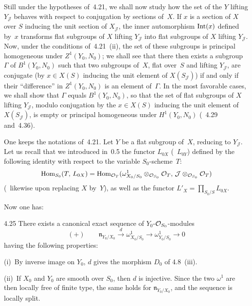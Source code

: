 \label{III.4.23}
Still under the hypotheses of~4.21, we shall now study how the set of the
\(Y\) lifting \(Y_{\mathcal{J}}\) behaves with respect to conjugation by
sections of~\(X\). If \(x\) is a section of \(X\) over \(S\) inducing the unit
section of \(X_{\mathcal{J}}\), the inner automorphism \(\operatorname{Int}(x)\) defined
by~\(x\) transforms flat subgroups of \(X\) lifting \(Y_{\mathcal{J}}\) into
flat subgroups of \(X\) lifting \(Y_{\mathcal{J}}\). Now, under the conditions
of~4.21~(ii), the set of these subgroups is principal homogeneous under
\(Z^{1}(Y_{0},N_{0})\); we shall see that there then exists a subgroup
\(\Gamma\) of \(B^{1}(Y_{0},N_{0})\)%
{\renewcommand{\thefootnote}{(121)}}
such that two subgroups of~\(X\), flat over~\(S\) and lifting
\(Y_{\mathcal{J}}\), are conjugate (by \(x\in X(S)\) inducing the unit element
of \(X(S_{\mathcal{J}})\)) if and only if their ``difference'' in
\(Z^{1}(Y_{0},N_{0})\) is an element of~\(\Gamma\). In the most favorable
cases, we shall show that \(\Gamma\) equals \(B^{1}(Y_{0},N_{0})\), so that
the set of flat subgroups of \(X\) lifting \(Y_{\mathcal{J}}\), modulo
conjugation by the \(x\in X(S)\) inducing the unit element of
\(X(S_{\mathcal{J}})\), is empty or principal homogeneous under
\(H^{1}(Y_{0},N_{0})\) (\cf~4.29 and~4.36).

\label{III.4.24}
One keeps the notations of~4.21. Let \(Y\) be a flat subgroup of~\(X\),
reducing to \(Y_{\mathcal{J}}\). Let us recall that we introduced in~0.5 the
functor \(L_{0X}\) (\resp\ \(L_{0Y}\)) defined by the following identity with
respect to the variable \(S_{0}\)-scheme~\(T\):
\[
\operatorname{Hom}_{S_{0}}(T,\,L_{0X})
=
\operatorname{Hom}_{\mathcal{O}_{T}}(\omega^{1}_{X_{0}/S_{0}}\otimes_{\mathcal{O}_{S_{0}}}\mathcal{O}_{T},\,
\mathcal{J}\otimes_{\mathcal{O}_{S_{0}}}\mathcal{O}_{T})
\]
(\resp\ likewise upon replacing \(X\) by~\(Y\)), as well as the functor
\(L'_{X}=\prod_{S_{0}/S}L_{0X}\).

Now one has:

\begin{lemma}{4.25}\label{III.4.25}
There exists a canonical exact sequence of \(Y_{0}\)-\(\mathcal{O}_{S_{0}}\)-modules
\[
(+)\qquad
\mathfrak{n}_{Y_{0}/X_{0}}
\xrightarrow{d}
\omega^{1}_{X_{0}/S_{0}}
\longrightarrow
\omega^{1}_{Y_{0}/S_{0}}
\longrightarrow
0
\]
having the following properties:

(i)~By inverse image on \(Y_{0}\), \(d\) gives the morphism \(D_{0}\) of
4.8~(iii).

(ii)~If \(X_{0}\) and \(Y_{0}\) are smooth over \(S_{0}\), then \(d\) is
injective. Since the two \(\omega^{1}\) are then locally free of finite type,
the same holds for \(\mathfrak{n}_{Y_{0}/X_{0}}\), and the sequence is locally
split.
\end{lemma}


